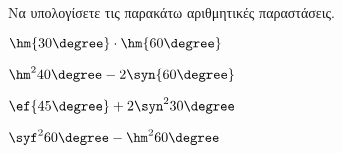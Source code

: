 Να υπολογίσετε τις παρακάτω αριθμητικές παραστάσεις.
\begin{multicols}{2}
\begin{alist}[leftmargin=4mm]
\item $ \hm{30\degree}\cdot\hm{60\degree} $
\item $ \hm^2{40\degree}-2\syn{60\degree} $
\item $ \ef{45\degree}+2\syn^2{30\degree} $
\item $ \syf^2{60\degree}-\hm^2{60\degree} $
\end{alist}
\end{multicols}
